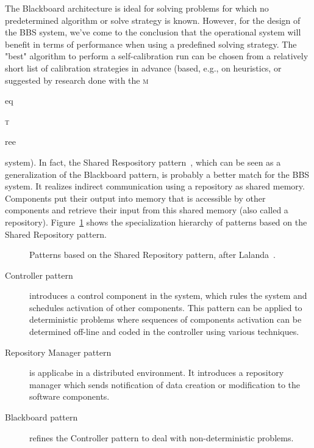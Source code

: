\documentclass[10pt]{lofar}
\newcommand{\meqtree}{\textsc{m}\begin{footnotesize}eq\end{footnotesize}\textsc{t}\begin{footnotesize}ree\end{footnotesize}\xspace}
\begin{document}
The Blackboard architecture is ideal for solving problems for which no
predetermined algorithm or solve strategy is known. However, for the design of
the BBS system, we've come to the conclusion that the operational system will
benefit in terms of performance when using a predefined solving strategy. The
"best" algorithm to perform a self-calibration run can be chosen from a
relatively short list of calibration strategies in advance (based, e.g., on
heuristics, or suggested by research done with the \meqtree system).  In fact,
the Shared Respository pattern~\cite{Lalanda1998}, which can be seen as a
generalization of the Blackboard pattern, is probably a better match for the
BBS system. It realizes indirect communication using a repository as shared
memory. Components put their output into memory that is accessible by other
components and retrieve their input from this shared memory (also called a
repository). Figure~\ref{fig:shared-repository-pattern} shows the
specialization hierarchy of patterns based on the Shared Repository pattern.

\begin{figure}[!ht]
\centering
{}
\caption{Patterns based on the Shared Repository pattern, after
Lalanda~\cite{Lalanda1998}.}
\label{fig:shared-repository-pattern}
\end{figure}

\begin{description}
\item [Controller pattern] introduces a control component in the system, which
rules the system and schedules activation of other components. This pattern
can be applied to deterministic problems where sequences of components
activation can be determined off-line and coded in the controller using
various techniques.
\item[Repository Manager pattern] is applicabe in a distributed
environment. It introduces a repository manager which sends notification of
data creation or modification to the software components.
\item[Blackboard pattern] refines the Controller pattern to deal with
non-deterministic problems.
\end{description}
\end{document}
